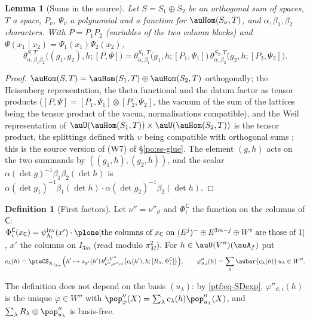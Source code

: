 \documentclass[10pt]{amsart}
\newtheorem{lemma}[theorem]{Lemma}
\theoremstyle{definition}
\newtheorem{definition}[theorem]{Definition}
\theoremstyle{remark}
\begin{document}
\begin{lemma}[Sums in the source]\label{ptf:sum}
Let $S=S_1\oplus S_2$ be an orthogonal sum of spaces, $T$ a space, $P_\nu$, $\Psi_\nu$ a polynomial and a
function for $\auHom(S_\nu,T)$, and $\alpha,\beta_1,\beta_2$ characters. With $P=P_1P_2$ (variables of the two
column blocks) and $\Psi(x_1\mid x_2)=\Psi_1(x_1)\Psi_2(x_2)$,
\[
\theta^{S,T}_{\alpha,\beta_1\beta_2}\bigl((g_1,g_2),h;[P,\Psi]\bigr)=\theta^{S_1,T}_{\alpha,\beta_1}\bigl(g_1,h;[P_1,\Psi_1]\bigr)\,
\theta^{S_2,T}_{\alpha,\beta_2}\bigl(g_2,h;[P_2,\Psi_2]\bigr).
\]
\end{lemma}
\begin{proof}
$\auHom(S,T)=\auHom(S_1,T)\oplus\auHom(S_2,T)$ orthogonally; the Heisenberg representation, the theta functional
and the datum factor as tensor products ($[P,\Psi]=[P_1,\Psi_1]\otimes[P_2,\Psi_2]$, the vacuum of the sum of
the lattices being the tensor product of the vacua, normalisations compatible), and the Weil representation of
$\auU(\auHom(S_1,T))\times\auU(\auHom(S_2,T))$ is the tensor product, the splittings defined with $\upsilon$ being
compatible with orthogonal sums \cite{KudlaSplitting}; this is the source version of (W7) of
\S\ref{po:ss-glue}. The element $(g,h)$ acts on the two summands by $((g_1,h),(g_2,h))$, and the scalar
$\alpha(\det g)^{-1}\beta_1\beta_2(\det h)$ is $\alpha(\det g_1)^{-1}\beta_1(\det h)\cdot\alpha(\det g_2)^{-1}\beta_2(\det h)$.
\end{proof}

\begin{definition}[First factors]\label{ptf:def-ff}
Let $\nu''=\nu''_\vartheta$ and $\Phi^{\mathsf C}_i$ the function on the columns of $\mathsf C$:
$\Phi^{\mathsf C}_i(x_{\mathsf C})=\psi^{\mathrm{inv}}_{\Lambda_i}(x')\cdot\plone[\text{the columns of }x_{\mathsf C}\text{ on }(E^j)^-\oplus E^{3m-j}
\oplus W^\flat\text{ are those of }1]$, $x'$ the columns on $I_{3m}$ (read modulo $\pi_M^2$). For $h\in
\auU(V'')(\auA_f)$ put
\[
c_{\lambda}(h)=\pteCS_{K_{I_{3m}}}\Bigl(h'\mapsto\mathrm a_{\chi'}(h')\,\theta^{\mathsf C,V''}_{\nu'',\nu''\upsilon^{j}}\bigl(c_i(h'),h;
[R_\lambda,\Phi^{\mathsf C}_i]\bigr)\Bigr),\qquad\varphi''_{\vartheta,i}(h)=\sum_\lambda\aubar{c_\lambda(h)}\,u_\lambda\in W''.
\]
\end{definition}

The definition does not depend on the basis $(u_\lambda)$: by \eqref{ptf:eq-SDexp}, $\varphi''_{\vartheta,i}(h)$ is the
unique $\varphi\in W''$ with $\pop''_{\varphi}(X)=\sum_\lambda c_\lambda(h)\pop''_{u_\lambda}(X)$, and $\sum_\lambda R_\lambda\otimes
\pop''_{u_\lambda}$ is basis-free.
\end{document}

